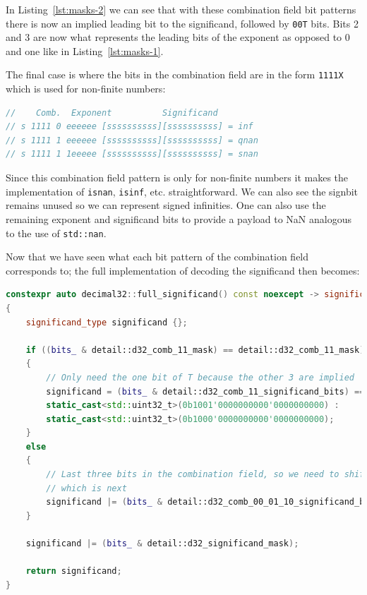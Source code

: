 \documentclass[acmsmall]{acmart}
\newcommand{\code}[1]{\texttt{#1}}
\begin{document}
In Listing~\ref{lst:masks-2} we can see that with these combination field bit patterns there is now an implied leading bit to the significand, followed by \code{00T} bits.
Bits 2 and 3 are now what represents the leading bits of the exponent as opposed to 0 and one like in Listing~\ref{lst:masks-1}.

The final case is where the bits in the combination field are in the form \code{1111X} which is used for non-finite numbers:

\begin{lstlisting}[language=C++, caption={Combination Field Pattern 3}, label={lst:non-finite}]
//    Comb.  Exponent          Significand
// s 1111 0 eeeeee [ssssssssss][ssssssssss] = inf
// s 1111 1 eeeeee [ssssssssss][ssssssssss] = qnan
// s 1111 1 1eeeee [ssssssssss][ssssssssss] = snan
\end{lstlisting}

Since this combination field pattern is only for non-finite numbers it makes the implementation of \code{isnan}, \code{isinf}, etc. straightforward.
We can also see the signbit remains unused so we can represent signed infinities.
One can also use the remaining exponent and significand bits to provide a payload to NaN analogous to the use of \code{std::nan}\cite{cppreference_nan}.

Now that we have seen what each bit pattern of the combination field corresponds to; the full implementation of decoding the significand then becomes:

\begin{lstlisting}[language=C++, caption={Basic Usage}, label={lst:decode-sig}]
constexpr auto decimal32::full_significand() const noexcept -> significand_type
{
    significand_type significand {};

    if ((bits_ & detail::d32_comb_11_mask) == detail::d32_comb_11_mask)
    {
        // Only need the one bit of T because the other 3 are implied
        significand = (bits_ & detail::d32_comb_11_significand_bits) == detail::d32_comb_11_significand_bits ?
        static_cast<std::uint32_t>(0b1001'0000000000'0000000000) :
        static_cast<std::uint32_t>(0b1000'0000000000'0000000000);
    }
    else
    {
        // Last three bits in the combination field, so we need to shift past the exp field
        // which is next
        significand |= (bits_ & detail::d32_comb_00_01_10_significand_bits) >> detail::d32_exponent_bits;
    }

    significand |= (bits_ & detail::d32_significand_mask);

    return significand;
}
\end{lstlisting}
\end{document}
